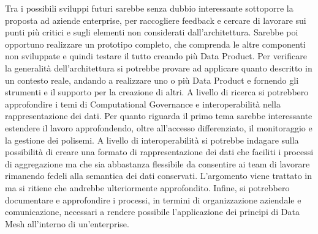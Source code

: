 \documentclass[12pt]{report}
\begin{document}
Tra i possibili sviluppi futuri sarebbe senza dubbio interessante sottoporre la proposta ad aziende enterprise, per raccogliere feedback e cercare di lavorare sui punti più critici e sugli elementi non considerati dall'architettura.
Sarebbe poi opportuno realizzare un prototipo completo, che comprenda le altre componenti non sviluppate e quindi  testare il tutto creando più Data Product.
Per verificare la generalità dell'architettura si potrebbe provare ad applicare quanto descritto in un contesto reale, andando a realizzare uno o più Data Product e fornendo gli strumenti e il supporto per la creazione di altri.
A livello di ricerca si potrebbero approfondire i temi di Computational Governance e interoperabilità nella rappresentazione dei dati.
Per quanto riguarda il primo tema sarebbe interessante estendere il lavoro approfondendo, oltre all'accesso differenziato, il monitoraggio e la gestione dei polisemi.
A livello di interoperabilità si potrebbe indagare sulla possibilità di creare una formato di rappresentazione dei dati che faciliti i processi di aggregazione ma che sia abbastanza flessibile da consentire ai team di lavorare rimanendo fedeli alla semantica dei dati conservati.
L'argomento viene trattato in \cite{dehghani_data_2022} ma si ritiene che andrebbe ulteriormente approfondito.
Infine, si potrebbero documentare e approfondire i processi, in termini di organizzazione aziendale e comunicazione, necessari a rendere possibile l'applicazione dei principi di Data Mesh all'interno di un'enterprise.
 
 
\end{document}
